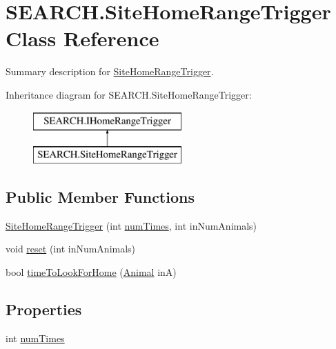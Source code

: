 \hypertarget{class_s_e_a_r_c_h_1_1_site_home_range_trigger}{\section{S\-E\-A\-R\-C\-H.\-Site\-Home\-Range\-Trigger Class Reference}
\label{class_s_e_a_r_c_h_1_1_site_home_range_trigger}
}


Summary description for \hyperlink{class_s_e_a_r_c_h_1_1_site_home_range_trigger}{Site\-Home\-Range\-Trigger}.  


Inheritance diagram for S\-E\-A\-R\-C\-H.\-Site\-Home\-Range\-Trigger\-:\begin{figure}[H]
\begin{center}
\leavevmode
\includegraphics[height=2.000000cm]{class_s_e_a_r_c_h_1_1_site_home_range_trigger}
\end{center}
\end{figure}
\subsection*{Public Member Functions}
\begin{DoxyCompactItemize}
\item 
\hyperlink{class_s_e_a_r_c_h_1_1_site_home_range_trigger_a009fd626c855b60e4e0a56ecfd3865c7}{Site\-Home\-Range\-Trigger} (int \hyperlink{class_s_e_a_r_c_h_1_1_site_home_range_trigger_ac970fa3d8b811d475886681569e0929d}{num\-Times}, int in\-Num\-Animals)
\item 
void \hyperlink{class_s_e_a_r_c_h_1_1_site_home_range_trigger_a7266d98080f93ce4ad13e0b6ecfa805c}{reset} (int in\-Num\-Animals)
\item 
bool \hyperlink{class_s_e_a_r_c_h_1_1_site_home_range_trigger_a89af0390fd4719b591b674c4f9f60863}{time\-To\-Look\-For\-Home} (\hyperlink{class_s_e_a_r_c_h_1_1_animal}{Animal} in\-A)
\end{DoxyCompactItemize}
\subsection*{Properties}
\begin{DoxyCompactItemize}
\item 
int \hyperlink{class_s_e_a_r_c_h_1_1_site_home_range_trigger_ac970fa3d8b811d475886681569e0929d}{num\-Times}
\end{DoxyCompactItemize}


